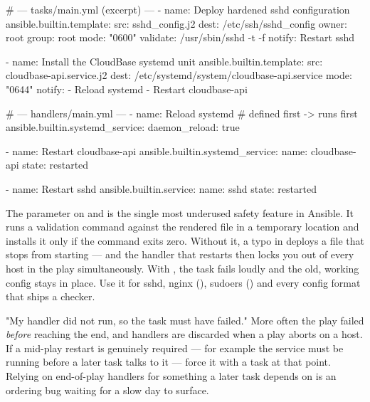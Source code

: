 \begin{ansiblebox}
# --- tasks/main.yml (excerpt) ---
- name: Deploy hardened sshd configuration
  ansible.builtin.template:
    src: sshd_config.j2
    dest: /etc/ssh/sshd_config
    owner: root
    group: root
    mode: "0600"
    validate: /usr/sbin/sshd -t -f %
  notify: Restart sshd

- name: Install the CloudBase systemd unit
  ansible.builtin.template:
    src: cloudbase-api.service.j2
    dest: /etc/systemd/system/cloudbase-api.service
    mode: "0644"
  notify:
    - Reload systemd
    - Restart cloudbase-api

# --- handlers/main.yml ---
- name: Reload systemd            # defined first -> runs first
  ansible.builtin.systemd_service:
    daemon_reload: true

- name: Restart cloudbase-api
  ansible.builtin.systemd_service:
    name: cloudbase-api
    state: restarted

- name: Restart sshd
  ansible.builtin.service:
    name: sshd
    state: restarted
\end{ansiblebox}

\begin{reliability}
The  parameter on  and  is the single most underused safety feature in Ansible. It runs a validation command against the rendered file in a temporary location and installs it only if the command exits zero. Without it, a typo in  deploys a file that stops  from starting --- and the handler that restarts  then locks you out of every host in the play simultaneously. With , the task fails loudly and the old, working config stays in place. Use it for sshd, nginx (), sudoers () and every config format that ships a checker.
\end{reliability}

\begin{misconception}
"My handler did not run, so the task must have failed." More often the play failed \emph{before} reaching the end, and handlers are discarded when a play aborts on a host. If a mid-play restart is genuinely required --- for example the service must be running before a later task talks to it --- force it with a  task at that point. Relying on end-of-play handlers for something a later task depends on is an ordering bug waiting for a slow day to surface.
\end{misconception}

